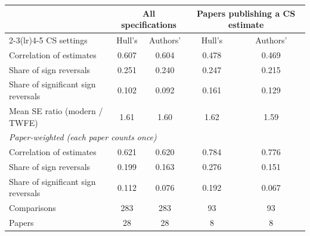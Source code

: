 \begin{tabular}{lcccc}
\toprule
 & \multicolumn{2}{c}{All specifications} & \multicolumn{2}{c}{Papers publishing a CS estimate} \\
\cmidrule(lr){2-3}\cmidrule(lr){4-5}
CS settings & Hull's & Authors' & Hull's & Authors' \\
\midrule
Correlation of estimates & 0.607 & 0.604 & 0.478 & 0.469 \\
Share of sign reversals & 0.251 & 0.240 & 0.247 & 0.215 \\
Share of significant sign reversals & 0.102 & 0.092 & 0.161 & 0.129 \\
Mean SE ratio (modern / TWFE) & 1.61 & 1.60 & 1.62 & 1.59 \\
\midrule
\multicolumn{5}{l}{\emph{Paper-weighted (each paper counts once)}} \\
Correlation of estimates & 0.621 & 0.620 & 0.784 & 0.776 \\
Share of sign reversals & 0.199 & 0.163 & 0.276 & 0.151 \\
Share of significant sign reversals & 0.112 & 0.076 & 0.192 & 0.067 \\
\midrule
Comparisons & 283 & 283 & 93 & 93 \\
Papers & 28 & 28 & 8 & 8 \\
\bottomrule
\end{tabular}
